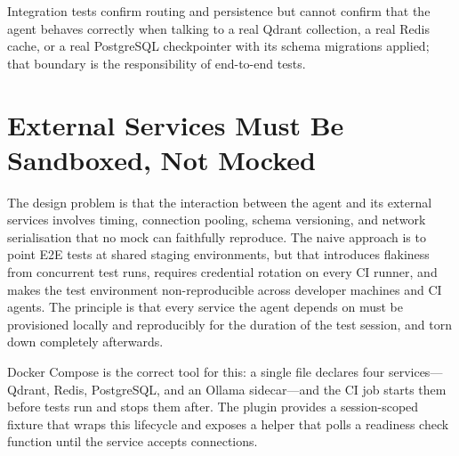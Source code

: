 Integration tests confirm routing and persistence but cannot confirm
that the agent behaves correctly when talking to a real Qdrant
collection, a real Redis cache, or a real PostgreSQL checkpointer with
its schema migrations applied; that boundary is the responsibility of
end-to-end tests.

\section{External Services Must Be Sandboxed, Not Mocked}
\label{sec:e2e-sandboxed}

The design problem is that the interaction between the agent and its
external services involves timing, connection pooling, schema
versioning, and network serialisation that no mock can faithfully
reproduce.
The naive approach is to point E2E tests at shared staging
environments, but that introduces flakiness from concurrent test
runs, requires credential rotation on every CI runner, and makes the
test environment non-reproducible across developer machines and CI
agents.
The principle is that every service the agent depends on must be
provisioned locally and reproducibly for the duration of the test
session, and torn down completely afterwards.

Docker Compose is the correct tool for this: a single
 file declares four services---Qdrant,
Redis, PostgreSQL, and an Ollama sidecar---and the CI job starts them
before tests run and stops them after.
The  plugin provides a session-scoped
 fixture that wraps this lifecycle and exposes
a  helper that polls a readiness check
function until the service accepts connections.

